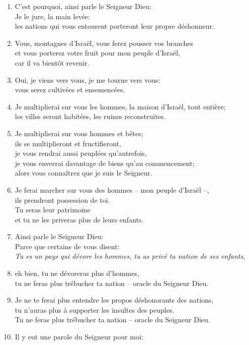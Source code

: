 \documentclass[12pt,a4paper,titlepage]{article}
\def \pslabelsep{0.2em} %
\def \psleftmargin{0em} %
\begin{document}
\begin{enumerate}[leftmargin=\psleftmargin, labelsep = \pslabelsep, label={\arabic*}, font=\color{\pscolor}\small\textsuperscript, parsep=0em, itemsep=0em, topsep=0em ]
\item  C’est pourquoi, ainsi parle le Seigneur Dieu: \\ Je le jure, la main levée: \\ les nations qui vous entourent porteront leur propre déshonneur.\verseSpace
\item  Vous, montagnes d’Israël, vous ferez pousser vos branches \\ et vous porterez votre fruit pour mon peuple d’Israël, \\ car il va bientôt revenir.
\item  Oui, je viens vers vous, je me tourne vers vous: \\ vous serez cultivées et ensemencées.
\item  Je multiplierai sur vous les hommes, la maison d’Israël, tout entière; \\ les villes seront habitées, les ruines reconstruites.
 \item  Je multiplierai sur vous hommes et bêtes; \\ ils se multiplieront et fructifieront, \\ je vous rendrai aussi peuplées qu’autrefois, \\ je vous enverrai davantage de biens qu’au commencement; \\ alors vous connaîtrez que je suis le Seigneur.
\item  Je ferai marcher sur vous des hommes – mon peuple d’Israël –, \\ ils prendront possession de toi. \\ Tu seras leur patrimoine \\ et tu ne les priveras plus de leurs enfants. \newpage
\item  Ainsi parle le Seigneur Dieu: \\ Parce que certains de vous disent: \\ \og{}\emph{Tu es un pays qui dévore les hommes, tu as privé ta nation de ses enfants}\fg{},
\item  eh bien, tu ne dévoreras plus d’hommes, \\ tu ne feras plus trébucher ta nation – oracle du Seigneur Dieu.
\item  Je ne te ferai plus entendre les propos déshonorants des nations, \\ tu n’auras plus à supporter les insultes des peuples. \\ Tu ne feras plus trébucher ta nation – oracle du Seigneur Dieu. \parSpace
\item Il y eut une parole du Seigneur pour moi:

\end{enumerate}
\end{document}
